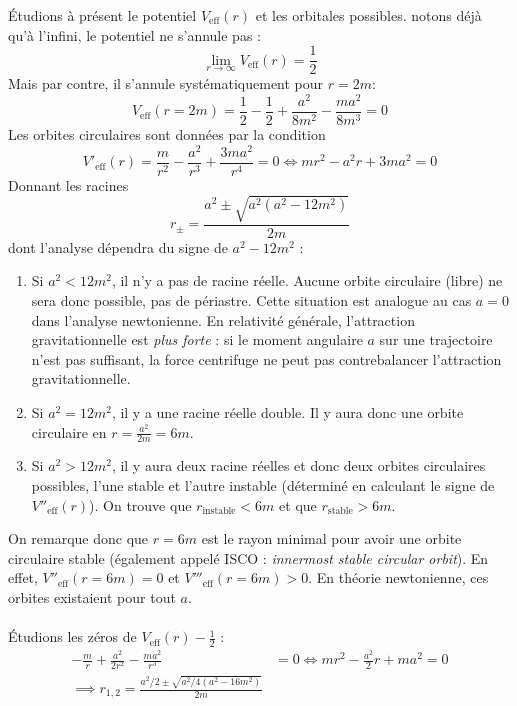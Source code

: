 \cutebreak
Étudions à présent le potentiel $V_\text{eff} (r)$ et les orbitales possibles. notons déjà qu'à l'infini, le potentiel ne s'annule pas :
\begin{equation}
    \lim_{r\to \infty} V_\text{eff} (r) = \frac{1}{2}
\end{equation}
Mais par contre, il s'annule systématiquement pour $r = 2m$:
\begin{equation}
    V_\text{eff} (r = 2m) = \frac{1}{2} - \frac{1}{2} + \frac{a^2}{8m^2} - \frac{ma^2}{8m^3} = 0
\end{equation}
Les orbites circulaires sont données par la condition
\begin{equation}
    V'_\text{eff} (r) = \frac{m}{r^2} - \frac{a^2}{r^3} + \frac{3ma^2}{r^4} = 0 \iff mr^2 - a^2 r + 3ma^2 = 0
\end{equation}
Donnant les racines
\begin{equation}
    r_\pm = \frac{a^2 \pm \sqrt{a^2(a^2-12m^2)}}{2m}
\end{equation}
dont l'analyse dépendra du signe de $a^2 - 12m^2$ :
\begin{enumerate}
    \item Si $a^2<12m^2$, il n'y a pas de racine réelle. Aucune orbite circulaire (libre) ne sera donc possible, pas de périastre. Cette situation est analogue au cas $a=0$ dans l'analyse newtonienne. En relativité générale, l'attraction gravitationnelle est \emph{plus forte} : si le moment angulaire $a$ sur une trajectoire n'est pas suffisant, la force centrifuge ne peut pas contrebalancer l'attraction gravitationnelle.
    \item Si $a^2=12m^2$, il y a une racine réelle double. Il y aura donc une orbite circulaire en $r = \frac{a^2}{2m} = 6m$.
    \item Si $a^2>12m^2$, il y aura deux racine réelles et donc deux orbites circulaires possibles, l'une stable et l'autre instable (déterminé en calculant le signe de $V''_\text{eff} (r)$). On trouve que $r_\text{instable}<6m$ et que $r_\text{stable}>6m$.
\end{enumerate}
On remarque donc que $r=6m$ est le rayon minimal pour avoir une orbite circulaire stable (également appelé ISCO : \emph{innermost stable circular orbit}). En effet, $V''_\text{eff} (r=6m) =0$ et $V'''_\text{eff} (r=6m)>0$. En théorie newtonienne, ces orbites existaient pour tout $a$.\\
\\
Étudions les zéros de $V_\text{eff} (r) - \frac{1}{2}$ : 
\begin{align}
    -\frac{m}{r} +\frac{a^2}{2r^2} - \frac{ma^2}{r^3} &= 0 \iff mr^2 - \frac{a^2}{2}r +ma^2 =0\\
    \implies r_{1,2} = \frac{a^2/2 \pm \sqrt{a^2/4 (a^2 -16m^2)}}{2m}
\end{align}
